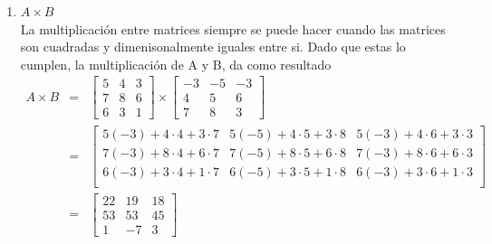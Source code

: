 \documentclass[12pt]{article}
\begin{document}
\begin{enumerate}
\begin{enumerate}
\begin{enumerate}
			\item $A \times B$ \\ La multiplicaci\'on entre matrices siempre se puede hacer cuando las matrices son cuadradas y dimenisonalmente iguales entre si. Dado que estas lo cumplen, la multiplicaci\'on de A y B, da como resultado
				\begin{eqnarray*}
					A \times B &=& 	\begin{bmatrix}
									5 & 4 & 3 \\
									7 & 8 & 6 \\
									6 & 3 & 1
								\end{bmatrix} \times \begin{bmatrix}
									-3&-5 &-3 \\
									4 & 5 & 6 \\
									7 & 8 & 3
								\end{bmatrix} \\
					&=& \begin{bmatrix}
					 		5(-3)+4\cdot 4+3\cdot 7&	5(-5)+4\cdot 5+3\cdot 8&	5(-3)+4\cdot 6+3\cdot 3 \\
							7(-3)+8\cdot 4+6\cdot 7&	7(-5)+8\cdot 5+6\cdot 8&	7(-3)+8\cdot 6+6\cdot 3 \\
							6(-3)+3\cdot 4+1\cdot 7&	6(-5)+3\cdot 5+1\cdot 8&	6(-3)+3\cdot 6+1\cdot 3 \\
						\end{bmatrix} \\
					&=& \begin{bmatrix}
							22 & 19 & 18 \\
							53 & 53 & 45 \\
							 1 & -7 &  3
						\end{bmatrix}
				\end{eqnarray*}
			

\end{enumerate}
\end{enumerate}
\end{enumerate}
\end{document}
